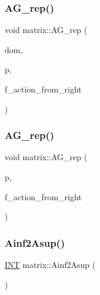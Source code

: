 \mbox{\label{classmatrix_a59a194ad8179725404d2b47a73070a88}} 
\subsubsection{\texorpdfstring{A\+G\+\_\+rep()}{AG\_rep()}\hspace{0.1cm}{\footnotesize\ttfamily [1/2]}}
{\footnotesize\ttfamily void matrix\+::\+A\+G\+\_\+rep (\begin{DoxyParamCaption}\item[{\mbox{\hyperlink{classdomain}{domain}} $\ast$}]{dom,  }\item[{\mbox{\hyperlink{classpermutation}{permutation}} \&}]{p,  }\item[{\mbox{\hyperlink{galois_8h_a09fddde158a3a20bd2dcadb609de11dc}{I\+NT}}}]{f\+\_\+action\+\_\+from\+\_\+right }\end{DoxyParamCaption})}

\mbox{\label{classmatrix_aac08bbc6eaee5b48801521e04607f2c2}} 
\subsubsection{\texorpdfstring{A\+G\+\_\+rep()}{AG\_rep()}\hspace{0.1cm}{\footnotesize\ttfamily [2/2]}}
{\footnotesize\ttfamily void matrix\+::\+A\+G\+\_\+rep (\begin{DoxyParamCaption}\item[{\mbox{\hyperlink{classpermutation}{permutation}} \&}]{p,  }\item[{\mbox{\hyperlink{galois_8h_a09fddde158a3a20bd2dcadb609de11dc}{I\+NT}}}]{f\+\_\+action\+\_\+from\+\_\+right }\end{DoxyParamCaption})}

\mbox{\label{classmatrix_a7abdfef775e6f1e68856bbdb06004dce}} 
\subsubsection{\texorpdfstring{Ainf2\+Asup()}{Ainf2Asup()}}
{\footnotesize\ttfamily \mbox{\hyperlink{galois_8h_a09fddde158a3a20bd2dcadb609de11dc}{I\+NT}} matrix\+::\+Ainf2\+Asup (\begin{DoxyParamCaption}{ }\end{DoxyParamCaption})}

